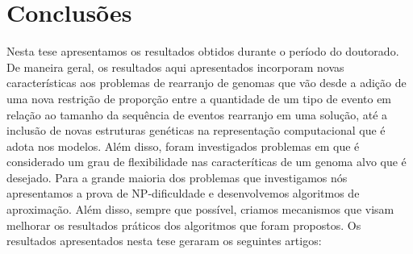 \chapter{Conclusões}\label{chapter:IXYEIWKC}

Nesta tese apresentamos os resultados obtidos durante o período do doutorado. De maneira geral, os resultados aqui apresentados incorporam novas características aos problemas de rearranjo de genomas que vão desde a adição de uma nova restrição de proporção entre a quantidade de um tipo de evento em relação ao tamanho da sequência de eventos rearranjo em uma solução, até a inclusão de novas estruturas genéticas na representação computacional que é adota nos modelos. Além disso, foram investigados problemas em que é considerado um grau de flexibilidade nas caracteríticas de um genoma alvo que é desejado. Para a grande maioria dos problemas que investigamos nós apresentamos a prova de NP-dificuldade e desenvolvemos algoritmos de aproximação. Além disso, sempre que possível, criamos mecanismos que visam melhorar os resultados práticos dos algoritmos que foram propostos. Os resultados apresentados nesta tese geraram os seguintes artigos:

